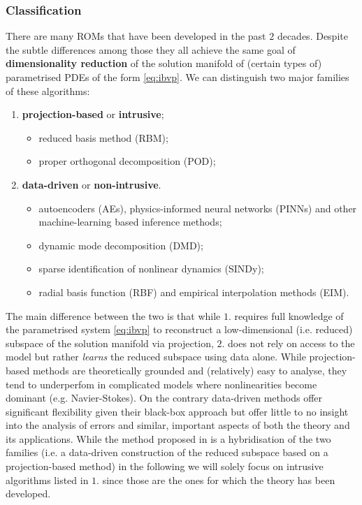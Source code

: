 \documentclass[../main.tex]{subfiles}
\begin{document}
\subsubsection{Classification}\label{subsubsec:classification}

There are many ROMs that have been developed in the past $2$ decades.
Despite the subtle differences among those they all achieve the same goal of \textbf{dimensionality reduction} of the solution manifold of (certain types of) parametrised PDEs of the form \eqref{eq:ibvp}.
We can distinguish two major families of these algorithms: 
\begin{enumerate}
     \item \textbf{projection-based} or \textbf{intrusive};
             \begin{itemize}
                  \item reduced basis method (RBM);
                  \item proper orthogonal decomposition (POD);
             \end{itemize}
     \item \textbf{data-driven} or \textbf{non-intrusive}.
             \begin{itemize}
                  \item autoencoders (AEs), physics-informed neural networks (PINNs) and other machine-learning based inference methods;
                  \item dynamic mode decomposition (DMD);
                  \item sparse identification of nonlinear dynamics (SINDy);
                  \item radial basis function (RBF) and empirical interpolation methods (EIM).
             \end{itemize}
\end{enumerate}
The main difference between the two is that while $1.$ requires full knowledge of the parametrised system \eqref{eq:ibvp} to reconstruct a low-dimensional (i.e. reduced) subspace of the solution manifold via projection, $2.$ does not rely on access to the model but rather \textit{learns} the reduced subspace using data alone. 
While projection-based methods are theoretically grounded and (relatively) easy to analyse, they tend to underperfom in complicated models where nonlinearities become dominant (e.g. Navier-Stokes).
On the contrary data-driven methods offer significant flexibility given their black-box approach but offer little to no insight into the analysis of errors and similar, important aspects of both the theory and its applications.
While the method proposed in \cite{Papapicco22} is a hybridisation of the two families (i.e. a data-driven construction of the reduced subspace based on a projection-based method) in the following we will solely focus on intrusive algorithms listed in $1.$ since those are the ones for which the theory has been developed.
\end{document}

